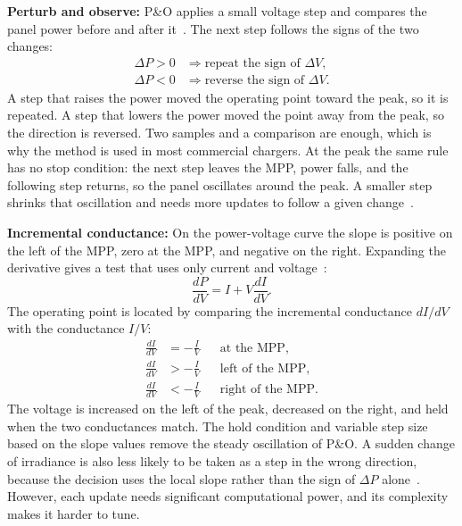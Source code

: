 \documentclass[conference]{IEEEtran}
\begin{document}
    \textbf{Perturb and observe:}
    P\&O applies a small voltage step and compares the panel power before and after it~\cite{chermitti2012improvement,Look-Up-Table_VS_PeO}. The next step follows the signs of the two changes:
    \begin{equation}
    \begin{aligned}
    \Delta P > 0 &\Rightarrow \text{repeat the sign of }\Delta V,\\
    \Delta P < 0 &\Rightarrow \text{reverse the sign of }\Delta V.
    \end{aligned}
    \label{eq:po}
    \end{equation}
    A step that raises the power moved the operating point toward the peak, so it is repeated. A step that lowers the power moved the point away from the peak, so the direction is reversed. Two samples and a comparison are enough, which is why the method is used in most commercial chargers. At the peak the same rule has no stop condition: the next step leaves the MPP, power falls, and the following step returns, so the panel oscillates around the peak. A smaller step shrinks that oscillation and needs more updates to follow a given change~\cite{MPPT_Comparison_techniques,Comparison_PV_Array_MPPT_Techniques_2007}. 

    \textbf{Incremental conductance:}
    On the power-voltage curve the slope is positive on the left of the MPP, zero at the MPP, and negative on the right. Expanding the derivative gives a test that uses only current and voltage~\cite{Intelligent_PV_Module_2006,Comparison_PV_Array_MPPT_Techniques_2007}:
    \begin{equation}
    \frac{dP}{dV}=I+V\frac{dI}{dV}.
    \label{eq:inc}
    \end{equation}
    The operating point is located by comparing the incremental conductance $dI/dV$ with the conductance $I/V$:
    \begin{equation}
    \begin{aligned}
    \frac{dI}{dV} &= -\frac{I}{V} && \text{at the MPP},\\
    \frac{dI}{dV} &> -\frac{I}{V} && \text{left of the MPP},\\
    \frac{dI}{dV} &< -\frac{I}{V} && \text{right of the MPP}.
    \end{aligned}
    \label{eq:inccond}
    \end{equation}
    The voltage is increased on the left of the peak, decreased on the right, and held when the two conductances match. The hold condition and variable step size based on the slope values remove the steady oscillation of P\&O. A sudden change of irradiance is also less likely to be taken as a step in the wrong direction, because the decision uses the local slope rather than the sign of $\Delta P$ alone~\cite{bendib_survey_mppt_methods}. However, each update needs significant computational power, and its complexity makes it harder to tune.
\end{document}
